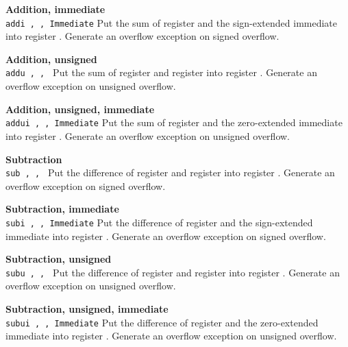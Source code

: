 \noindent
{\bf Addition, immediate}\\
\noindent
\texttt{addi \regd, \regs, Immediate}
Put the sum of register \regs{} and the sign-extended immediate
into register \regd{}. Generate an overflow exception on signed overflow.
\vspace{3ex}

\noindent
{\bf Addition, unsigned}\\
\noindent
\texttt{addu \regd, \regs, \regt}
Put the sum of register \regs{} and register \regt{}
into register \regd{}. Generate an overflow exception on unsigned overflow.
\vspace{3ex}
\newpage

\noindent
{\bf Addition, unsigned, immediate}\\
\noindent
\texttt{addui \regd, \regs, Immediate}
Put the sum of register \regs{} and the zero-extended immediate
into register \regd{}. Generate an overflow exception on unsigned overflow.
\vspace{3ex}

\noindent
{\bf Subtraction}\\
\noindent
\texttt{sub \regd, \regs, \regt}
Put the difference of register \regs{} and register \regt{}
into register \regd{}. Generate an overflow exception on signed overflow.
\vspace{3ex}

\noindent
{\bf Subtraction, immediate}\\
\noindent
\texttt{subi \regd, \regs, Immediate}
Put the difference of register \regs{} and the sign-extended immediate
into register \regd{}. Generate an overflow exception on signed overflow.
\vspace{3ex}

\noindent
{\bf Subtraction, unsigned}\\
\noindent
\texttt{subu \regd, \regs, \regt}
Put the difference of register \regs{} and register \regt{}
into register \regd{}. Generate an overflow exception on unsigned overflow.
\vspace{3ex}

\noindent
{\bf Subtraction, unsigned, immediate}\\
\noindent
\texttt{subui \regd, \regs, Immediate}
Put the difference of register \regs{} and the zero-extended immediate
into register \regd{}. Generate an overflow exception on unsigned overflow.
\vspace{3ex}

